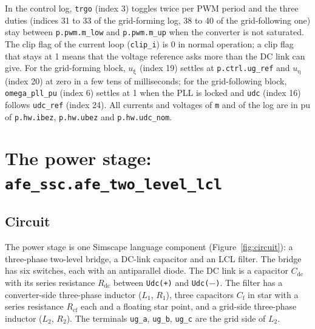 \documentclass[11pt,a4paper]{scrartcl}
\newcommand{\ped}[1]{_{\mathrm{#1}}}
\newcommand{\code}[1]{\texttt{#1}}
\begin{document}
\begin{onehalfspace}
In the control log, \code{trgo} (index 3) toggles twice per PWM period and the three duties (indices 31 to 33 of the grid-forming log, 38 to 40 of the grid-following one) stay between \code{p.pwm.m\_low} and \code{p.pwm.m\_up} when the converter is not saturated. The clip flag of the current loop (\code{clip\_i}) is 0 in normal operation; a clip flag that stays at 1 means that the voltage reference asks more than the DC link can give. For the grid-forming block, $u\ped{\xi}$ (index 19) settles at \code{p.ctrl.ug\_ref} and $u\ped{\eta}$ (index 20) at zero in a few tens of milliseconds; for the grid-following block, \code{omega\_pll\_pu} (index 6) settles at 1 when the PLL is locked and \code{udc} (index 16) follows \code{udc\_ref} (index 24). All currents and voltages of \code{m} and of the log are in pu of \code{p.hw.ibez}, \code{p.hw.ubez} and \code{p.hw.udc\_nom}.

\section{The power stage: \code{afe\_ssc.afe\_two\_level\_lcl}}
\label{sec:power_stage}

\subsection{Circuit}
\label{sec:circuit}

The power stage is one Simscape language component (Figure~\ref{fig:circuit}): a three-phase two-level bridge, a DC-link capacitor and an LCL filter. The bridge has six switches, each with an antiparallel diode. The DC link is a capacitor $C\ped{dc}$ with its series resistance $R\ped{dc}$ between \code{Udc(+)} and \code{Udc($-$)}. The filter has a converter-side three-phase inductor ($L\ped{1}$, $R\ped{1}$), three capacitors $C\ped{f}$ in star with a series resistance $R\ped{cf}$ each and a floating star point, and a grid-side three-phase inductor ($L\ped{2}$, $R\ped{2}$). The terminals \code{ug\_a}, \code{ug\_b}, \code{ug\_c} are the grid side of $L\ped{2}$.


\end{onehalfspace}
\end{document}
